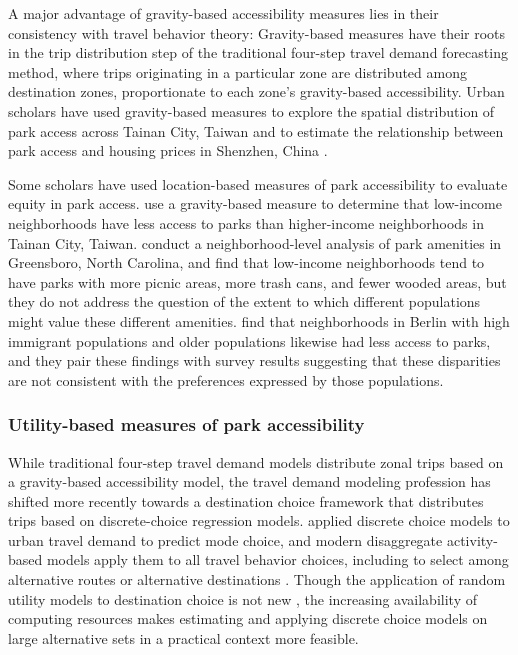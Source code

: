 \documentclass[3p, authoryear, review]{elsarticle} %
\begin{document}
A major advantage of gravity-based accessibility measures lies in their consistency with travel behavior theory: Gravity-based measures have their roots in the trip distribution step of the traditional four-step travel demand forecasting method, where trips originating in a particular zone are distributed among destination zones, proportionate to each zone's gravity-based accessibility. Urban scholars have used gravity-based measures to explore the spatial distribution of park access across Tainan City, Taiwan \citep{chang2011exploring} and to estimate the relationship between park access and housing prices in Shenzhen, China \citep{wu2017spatial}.

Some scholars have used location-based measures of park accessibility to evaluate equity in park access. \citet{chang2011exploring} use a gravity-based measure to determine that low-income neighborhoods have less access to parks than higher-income neighborhoods in Tainan City, Taiwan. \citet{bruton2014disparities} conduct a neighborhood-level analysis of park amenities in Greensboro, North Carolina, and find that low-income neighborhoods tend to have parks with more picnic areas, more trash cans, and fewer wooded areas, but they do not address the question of the extent to which different populations might value these different amenities. \citet{kabisch2014green} find that neighborhoods in Berlin with high immigrant populations and older populations likewise had less access to parks, and they pair these findings with survey results suggesting that these disparities are not consistent with the preferences expressed by those populations.

\hypertarget{utility-based-measures-of-park-accessibility}{%
\subsubsection{Utility-based measures of park accessibility}\label{utility-based-measures-of-park-accessibility}}

While traditional four-step travel demand models distribute zonal trips based on a gravity-based accessibility model, the travel demand modeling profession has shifted more recently towards a destination choice framework that distributes trips based on discrete-choice regression models. \citet{mcfadden1974measurementfirst} applied discrete choice models to urban travel demand to predict mode choice, and modern disaggregate activity-based models apply them to all travel behavior choices, including to select among alternative routes or alternative destinations \citep{de2011modelling}. Though the application of random utility models to destination choice is not new \citep[see][]{anas1983discrete}, the increasing availability of computing resources makes estimating and applying discrete choice models on large alternative sets in a practical context more feasible.
\end{document}
